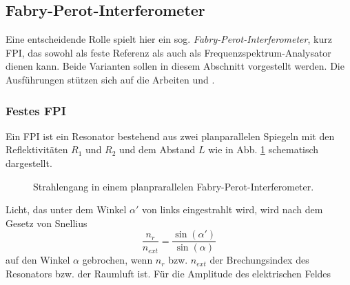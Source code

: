 \subsection{Fabry-Perot-Interferometer}
Eine entscheidende Rolle spielt hier ein sog.
\textit{Fabry-Perot-Interferometer}, kurz FPI, das sowohl
als feste Referenz als auch als Frequenzspektrum-Analysator dienen kann.
Beide Varianten sollen in diesem Abschnitt vorgestellt werden. Die Ausführungen
stützen sich auf die Arbeiten \cite{wiche:1997:diplomarbeit} und
\cite{kuschnick:2000:diplomarbeit}.

\subsubsection{Festes FPI}\label{subsubsec:festes_FPI}
Ein FPI ist ein Resonator bestehend aus zwei planparallelen Spiegeln mit den
Reflektivitäten $R_1$ und $R_2$ und dem Abstand $L$ wie in Abb.
\ref{fig:FPI_planparallel} schematisch dargestellt.
\begin{figure}[h]
 	\centering
	\caption[FPI - planparallel]{Strahlengang in einem
	planprarallelen Fabry-Perot-Interferometer.}\label{fig:FPI_planparallel}
\end{figure}
Licht, das unter dem Winkel
$\alpha'$ von links eingestrahlt wird, wird nach dem Gesetz von Snellius
\begin{equation}\label{eq:snellius}
	\frac{n_r}{n_{ext}}=\frac{\sin{(\alpha')}}{\sin{(\alpha)}}
\end{equation}
auf den Winkel $\alpha$ gebrochen, wenn $n_r$ bzw. $n_{ext}$ der Brechungsindex
des Resonators bzw. der Raumluft ist. Für die Amplitude des elektrischen Feldes
